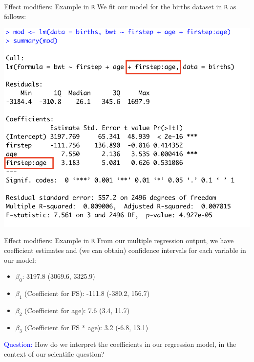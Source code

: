 \documentclass[10pt,t]{beamer}
\begin{document}
\begin{frame}{Effect modifiers: Example in \texttt{R}}
We fit our model for the births dataset in \texttt{R} as follows:

\vspace{0.3cm}

\centering \includegraphics[scale=0.4]{interact_mod2.png}
\end{frame}

\begin{frame}{Effect modifiers: Example in \texttt{R}}
From our multiple regression output, we have coefficient estimates and (we can obtain) confidence intervals for each variable in our model:

\vspace{0.3cm}

\begin{itemize}
	\item $\beta_0$: 3197.8 (3069.6, 3325.9)
	\item $\beta_1$ (Coefficient for FS): -111.8 (-380.2, 156.7)
	\item $\beta_2$ (Coefficient for age): 7.6 (3.4, 11.7)
	\item $\beta_3$ (Coefficient for FS * age): 3.2 (-6.8, 13.1)
\end{itemize}

\vspace{0.3cm}


\textcolor{blue}{Question:} How do we interpret the coefficients in our regression model, in the context of our scientific question? 
\end{frame}
\end{document}
